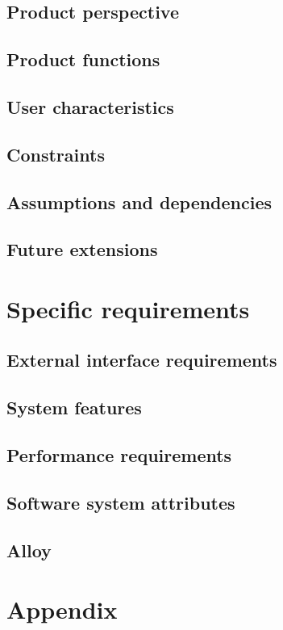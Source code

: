 \documentclass[12pt, a4paper]{report}
\begin{document}
\section{Product perspective}


\section{Product functions}


\section{User characteristics}


\section{Constraints}


\section{Assumptions and dependencies}


\section{Future extensions}


\chapter{Specific requirements}
\label{ch:requirements}

\section{External interface requirements}


\section{System features}


\section{Performance requirements}


\section{Software system attributes}


\section{Alloy}


\appendix
\chapter{Appendix}



\end{document}
